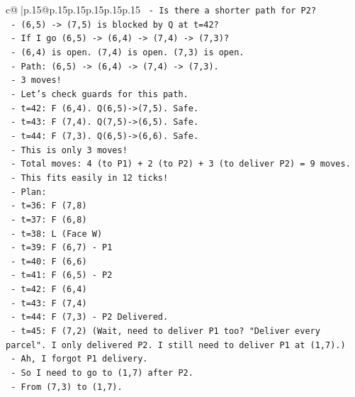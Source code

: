 \documentclass{article}
\begin{document}
{\begin{supertabular}{c@{$\;$}|p{.15\linewidth}@{}p{.15\linewidth}p{.15\linewidth}p{.15\linewidth}p{.15\linewidth}p{.15\linewidth}}
{{{\texttt{        {-} Is there a shorter path for P2?} \\
\texttt{        {-} (6,5) {-}> (7,5) is blocked by Q at t=42?} \\
\texttt{        {-} If I go (6,5) {-}> (6,4) {-}> (7,4) {-}> (7,3)?} \\
\texttt{        {-} (6,4) is open. (7,4) is open. (7,3) is open.} \\
\texttt{        {-} Path: (6,5) {-}> (6,4) {-}> (7,4) {-}> (7,3).} \\
\texttt{        {-} 3 moves!} \\
\texttt{        {-} Let's check guards for this path.} \\
\texttt{        {-} t=42: F (6,4). Q(6,5){-}>(7,5). Safe.} \\
\texttt{        {-} t=43: F (7,4). Q(7,5){-}>(6,5). Safe.} \\
\texttt{        {-} t=44: F (7,3). Q(6,5){-}>(6,6). Safe.} \\
\texttt{        {-} This is only 3 moves!} \\
\texttt{        {-} Total moves: 4 (to P1) + 2 (to P2) + 3 (to deliver P2) = 9 moves.} \\
\texttt{        {-} This fits easily in 12 ticks!} \\
\texttt{        {-} Plan:} \\
\texttt{          {-} t=36: F (7,8)} \\
\texttt{          {-} t=37: F (6,8)} \\
\texttt{          {-} t=38: L (Face W)} \\
\texttt{          {-} t=39: F (6,7) {-} P1} \\
\texttt{          {-} t=40: F (6,6)} \\
\texttt{          {-} t=41: F (6,5) {-} P2} \\
\texttt{          {-} t=42: F (6,4)} \\
\texttt{          {-} t=43: F (7,4)} \\
\texttt{          {-} t=44: F (7,3) {-} P2 Delivered.} \\
\texttt{          {-} t=45: F (7,2) (Wait, need to deliver P1 too? "Deliver every parcel". I only delivered P2. I still need to deliver P1 at (1,7).)} \\
\texttt{          {-} Ah, I forgot P1 delivery.} \\
\texttt{          {-} So I need to go to (1,7) after P2.} \\
\texttt{          {-} From (7,3) to (1,7).} \\
}}}
\end{supertabular}}
\end{document}
